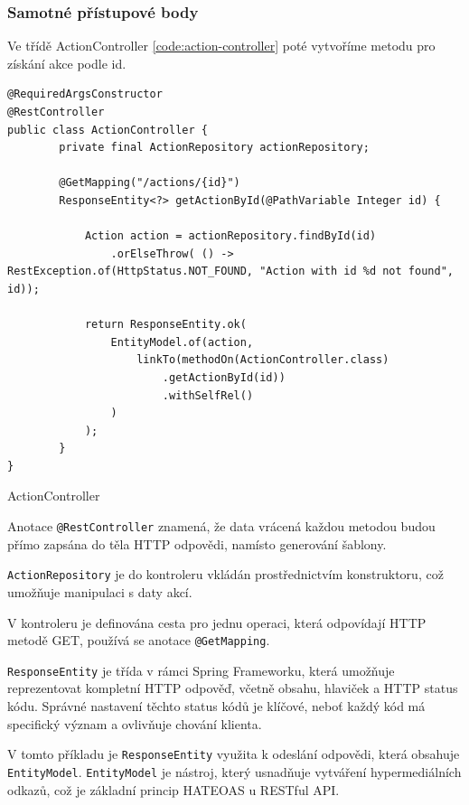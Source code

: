 \subsubsection*{Samotné přístupové body}

Ve třídě ActionController \ref{code:action-controller} poté vytvoříme metodu pro získání akce podle id.

\begin{listing}[H]
    \begin{verbatim}
@RequiredArgsConstructor
@RestController
public class ActionController {
        private final ActionRepository actionRepository;

        @GetMapping("/actions/{id}")
        ResponseEntity<?> getActionById(@PathVariable Integer id) {
            
            Action action = actionRepository.findById(id)
                .orElseThrow( () -> RestException.of(HttpStatus.NOT_FOUND, "Action with id %d not found", id));
            
            return ResponseEntity.ok(
                EntityModel.of(action,
                    linkTo(methodOn(ActionController.class)
                        .getActionById(id))
                        .withSelfRel()
                )
            );
        }
}
    \end{verbatim}
    \caption{ActionController}
    \label{code:action-controller}
\end{listing}

Anotace \texttt{@RestController} znamená, že data vrácená každou metodou budou přímo zapsána do těla HTTP odpovědi, namísto generování šablony.

\texttt{ActionRepository} je do kontroleru vkládán prostřednictvím konstruktoru, což umožňuje manipulaci s daty akcí.

V kontroleru je definována cesta pro jednu operaci, která odpovídají HTTP metodě GET, používá se anotace \texttt{@GetMapping}.

\texttt{ResponseEntity} je třída v rámci Spring Frameworku, která umožňuje reprezentovat kompletní HTTP odpověď, včetně obsahu, hlaviček a HTTP status kódu. Správné nastavení těchto status kódů je klíčové, neboť každý kód má specifický význam a ovlivňuje chování klienta.

V tomto příkladu je \texttt{ResponseEntity} využita k odeslání odpovědi, která obsahuje \texttt{EntityModel}. \texttt{EntityModel} je nástroj, který usnadňuje vytváření hypermediálních odkazů, což je základní princip HATEOAS u RESTful API.


